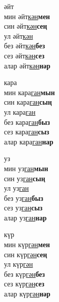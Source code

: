 \begin{multicols}{4}
\begin{enumerate}
\begin{minipage}{\linewidth}
    \item
    әйт\\
    мин әйт\underline{кән}\textbf{мен}\\
    син әйт\underline{кән}\textbf{сең}\\
    ул әйт\underline{кән}\\
    без әйт\underline{кән}\textbf{без}\\
    сез әйт\underline{кән}\textbf{сез}\\
    алар әйт\underline{кән}\textbf{нәр}\\
\end{minipage}

\begin{minipage}{\linewidth}
    \item
    кара\\
    мин кара\underline{ган}\textbf{мын}\\
    син кара\underline{ган}\textbf{сың}\\
    ул кара\underline{ган}\\
    без кара\underline{ган}\textbf{быз}\\
    сез кара\underline{ган}\textbf{сыз}\\
    алар кара\underline{ган}\textbf{нар}\\
\end{minipage}

\begin{minipage}{\linewidth}
    \item
    уз\\
    мин уз\underline{ган}\textbf{мын}\\
    син уз\underline{ган}\textbf{сың}\\
    ул уз\underline{ган}\\
    без уз\underline{ган}\textbf{быз}\\
    сез уз\underline{ган}\textbf{сыз}\\
    алар уз\underline{ган}\textbf{нар}\\
\end{minipage}

\begin{minipage}{\linewidth}
    \item
    күр\\
    мин күр\underline{гән}\textbf{мен}\\
    син күр\underline{гән}\textbf{сең}\\
    ул күр\underline{гән}\\
    без күр\underline{гән}\textbf{без}\\
    сез күр\underline{гән}\textbf{сез}\\
    алар күр\underline{гән}\textbf{нәр}\\
\end{minipage}


\end{enumerate}
\end{multicols}
